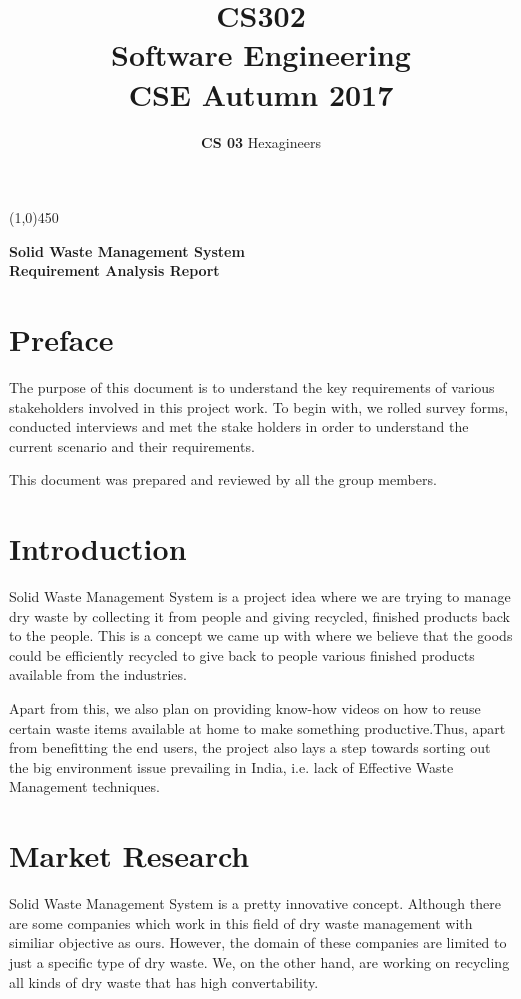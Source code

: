 \documentclass{article}
\title{\textbf{CS302}\\\HUGE Software Engineering\\
\LARGE CSE\hspace{\labelsep}\textbullet\hspace{\labelsep} Autumn 2017
}
\author{\textbf{CS 03} Hexagineers}
\begin{document}
\maketitle
\line(1,0){450}
\begin{center}
\Huge\textbf{Solid Waste Management System}\\
\Large \textbf{Requirement Analysis Report}
\end{center}
\newpage
\tableofcontents
\newpage
\section{Preface}
\par The purpose of this document is to understand the key requirements of various stakeholders involved in this project work. To begin with, we rolled survey forms, conducted interviews and met the stake holders in order to understand the current scenario and their requirements.
\par This document was prepared and reviewed by all the group members.
\newpage
\section{Introduction}
\par Solid Waste Management System is a project idea where we are trying to manage dry waste by collecting it from people and giving recycled, finished products back to the people. This is a concept we came up with where we believe that the goods could be efficiently recycled to give back to people various finished products available from the industries.
\par Apart from this, we also plan on providing know-how videos on how to reuse certain waste items available at home to make something productive.Thus, apart from benefitting the end users, the project also lays a step towards sorting out the big environment issue prevailing in India, i.e. lack of Effective Waste Management techniques.
\section{Market Research}
\par Solid Waste Management System is a pretty innovative concept. Although there are some companies which work in this field of dry waste management with similiar objective as ours. However, the domain of these companies are limited to just a specific type of dry waste.
We, on the other hand, are working on recycling all kinds of dry waste that has high convertability.
\end{document}
